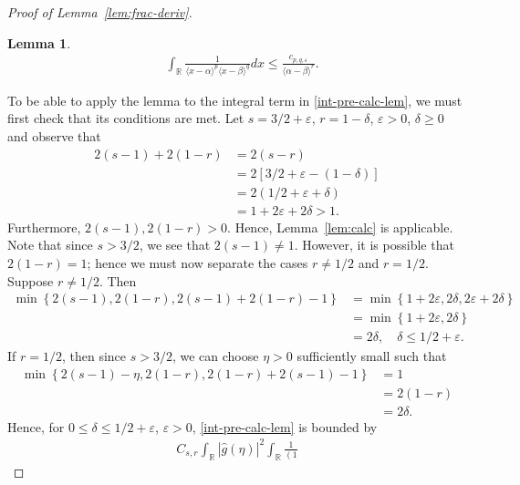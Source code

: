 \documentclass[12pt,reqno]{amsart}
\numberwithin{equation}{section}  %
\numberwithin{figure}{section}
\newcommand{\rr}{\mathbb{R}}
\newcommand{\wh}{\widehat}
\newcommand{\ee}{\varepsilon}
\newtheorem{lemma}[theorem]{Lemma}
\begin{document}
\begin{proof}[Proof of Lemma~\ref{lem:frac-deriv}]
\begin{lemma}
\begin{equation*}
\begin{split}
& \int_{\rr} \frac{1}{\langle x - \alpha \rangle ^{p} \langle x -
\beta \rangle
^{q}} d x
\le \frac{c_{p,q, \ee}}{\langle \alpha - \beta \rangle ^{r}}. 
\end{split}
\end{equation*}
\end{lemma}
To be able to apply the lemma to the integral term in \eqref{int-pre-calc-lem}, 
we must first check
that its conditions are met. Let $ s = 3/2 + \ee$, $r = 1- \delta$, $\ee > 0$, $
\delta \ge 0$ and observe that
%
%
\begin{equation*}
\begin{split}
2(s-1) + 2(1-r)
& = 2(s-r)
\\
& = 2[3/2 + \ee - (1 - \delta)]
\\
& = 2(1/2 + \ee + \delta)
\\
& = 1 + 2 \ee + 2 \delta > 1.
\end{split}
\end{equation*}
%
%
Furthermore, $2(s-1), 2(1-r) > 0$. Hence, Lemma~\ref{lem:calc} is applicable. 
Note that since $s > 3/2$, we see that $2(s-1) \neq 1$. However, it is possible that $2(1-r) =1$; hence we must now separate the cases $r \neq 1/2$ and $r = 1/2$. Suppose $r \neq 1/2$. Then 
%
%
\begin{equation*}
\begin{split}
\min\left\{ 2(s-1), 2(1-r), 2(s-1) + 2(1-r) -1 \right\}
& = \min\left\{ 1 + 2 \ee, 2 \delta, 2\ee + 2 \delta \right\}
\\
& = \min\left\{ 1 + 2 \ee, 2 \delta\right\}
\\
& = 2 \delta, \quad \delta \le 1/2 + \ee.
\end{split}
\end{equation*}
%
If $r = 1/2$, then since $s > 3/2$, we can choose $\eta > 0$ sufficiently small
such that
%
%
\begin{equation*}
\begin{split}
\min\left\{ 2(s-1) -\eta , 2(1-r), 2(1-r) + 2(s-1) - 1  \right\}
& = 1 
\\
& = 2(1 -r)
\\
& = 2\delta.
\end{split}
\end{equation*}
%
Hence, for $0 \le \delta \le 1/2 + \ee$, $\ee >
0$, \eqref{int-pre-calc-lem} is bounded by
\begin{equation*}
\begin{split}
C_{s,r} \int_{\rr}  | \wh{g}(\eta) |^{2} \int_{\rr} \frac{1}{\left( 1
}
\end{split}
\end{equation*}
\end{proof}
\end{document}
